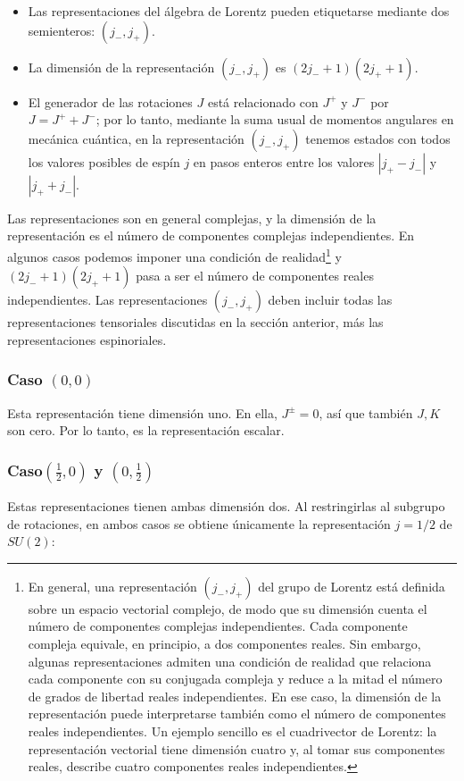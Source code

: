 \documentclass[a4paper,11pt]{book} %
\begin{document}
\begin{itemize}
  \item Las representaciones del álgebra de Lorentz pueden etiquetarse mediante
        dos semienteros: $(j_-, j_+)$.
  \item La dimensión de la representación $(j_-, j_+)$ es $(2j_- + 1)(2j_+ + 1)$.
  \item El generador de las rotaciones $J$ está relacionado con $J^+$ y
        $J^-$ por $J = J^+ + J^-$; por lo tanto, mediante la
        suma usual de momentos angulares en mecánica cuántica, en la
        representación $(j_-, j_+)$ tenemos estados con todos los valores
        posibles de espín $j$ en pasos enteros entre los valores $|j_+ - j_-|$ y
        $|j_+ + j_-|$.
\end{itemize}
Las representaciones son en general complejas, y la dimensión de la
representación es el número de componentes complejas independientes. En algunos
casos podemos imponer una condición de realidad\footnote{En general, una representación $(j_-,j_+)$ del grupo de Lorentz está definida sobre un espacio vectorial complejo, de modo que su dimensión cuenta el número de componentes complejas independientes. Cada componente compleja equivale, en principio, a dos componentes reales. Sin embargo, algunas representaciones admiten una condición de realidad que relaciona cada componente con su conjugada compleja y reduce a la mitad el número de grados de libertad reales independientes. En ese caso, la dimensión de la representación puede interpretarse también como el número de componentes reales independientes. Un ejemplo sencillo es el cuadrivector de Lorentz: la representación vectorial tiene dimensión cuatro y, al tomar sus componentes reales, describe cuatro componentes reales independientes.} y $(2j_- + 1)(2j_+ + 1)$ pasa a
ser el número de componentes reales independientes. Las representaciones
$(j_-, j_+)$ deben incluir todas las representaciones tensoriales discutidas en
la sección anterior, más las representaciones espinoriales. 
\subsubsection*{Caso $(0,0)$}
\noindent
 Esta representación tiene dimensión uno. En ella,
$J^{\pm} = 0$, así que también $J, K$ son cero. Por lo tanto, es la
representación escalar.
\subsubsection*{Caso$\left(\tfrac{1}{2}, 0\right)$ y $\left(0, \tfrac{1}{2}\right)$}
\noindent
Estas representaciones tienen ambas dimensión dos. Al restringirlas al subgrupo de rotaciones, en ambos casos se obtiene únicamente la representación $j=1/2$ de $SU(2)$:
\end{document}
